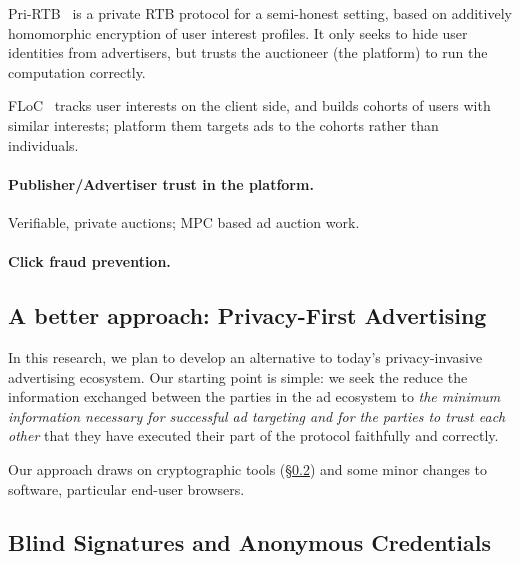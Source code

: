 Pri-RTB~\cite{pri-rtb} is a private RTB protocol for a semi-honest setting,
based on additively homomorphic encryption of user interest profiles.
%
It only seeks to hide user identities from advertisers, but trusts the
auctioneer (the platform) to run the computation correctly.
%

%
FLoC~\cite{floc} tracks user interests on the client side, and builds cohorts of
users with similar interests; platform them targets ads to the cohorts rather
than individuals.
%

\paragraph{Publisher/Advertiser trust in the platform.}

%
Verifiable, private auctions; MPC based ad auction work.
%

\paragraph{Click fraud prevention.}
%
%

\subsection{A better approach: Privacy-First Advertising}

%
In this research, we plan to develop an alternative to today's privacy-invasive
advertising ecosystem.
%
Our starting point is simple: we seek the reduce the information exchanged
between the parties in the ad ecosystem to \emph{the minimum information
necessary for successful ad targeting and for the parties to trust each other}
that they have executed their part of the protocol faithfully and correctly.
%

%
Our approach draws on cryptographic tools (\S\ref{s:bg-crypto}) and some minor
changes to software, particular end-user browsers.

\subsection{Blind Signatures and Anonymous Credentials}
\label{s:bg-crypto}


